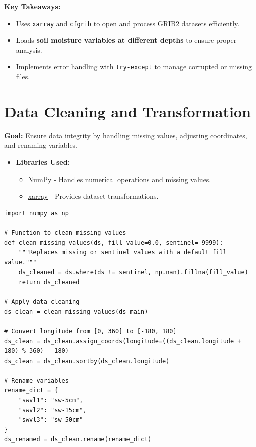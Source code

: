 \documentclass[a4paper,10pt]{article}
\begin{document}
\textbf{Key Takeaways:}
\begin{itemize}
    \item Uses \texttt{xarray} and \texttt{cfgrib} to open and process GRIB2 datasets efficiently.
    \item Loads \textbf{soil moisture variables at different depths} to ensure proper analysis.
    \item Implements error handling with \texttt{try-except} to manage corrupted or missing files.
\end{itemize}

\section{Data Cleaning and Transformation}
\textbf{Goal:} Ensure data integrity by handling missing values, adjusting coordinates, and renaming variables.

\begin{itemize}
    \item \textbf{Libraries Used:}
    \begin{itemize}
        \item \href{https://numpy.org/doc/stable/}{NumPy} - Handles numerical operations and missing values.
        \item \href{https://xarray.pydata.org/en/stable/}{xarray} - Provides dataset transformations.
    \end{itemize}
\end{itemize}

\begin{verbatim}
import numpy as np

# Function to clean missing values
def clean_missing_values(ds, fill_value=0.0, sentinel=-9999):
    """Replaces missing or sentinel values with a default fill value."""
    ds_cleaned = ds.where(ds != sentinel, np.nan).fillna(fill_value)
    return ds_cleaned

# Apply data cleaning
ds_clean = clean_missing_values(ds_main)

# Convert longitude from [0, 360] to [-180, 180]
ds_clean = ds_clean.assign_coords(longitude=((ds_clean.longitude + 180) % 360) - 180)
ds_clean = ds_clean.sortby(ds_clean.longitude)

# Rename variables
rename_dict = {
    "swvl1": "sw-5cm",
    "swvl2": "sw-15cm",
    "swvl3": "sw-50cm"
}
ds_renamed = ds_clean.rename(rename_dict)
\end{verbatim}
\end{document}
